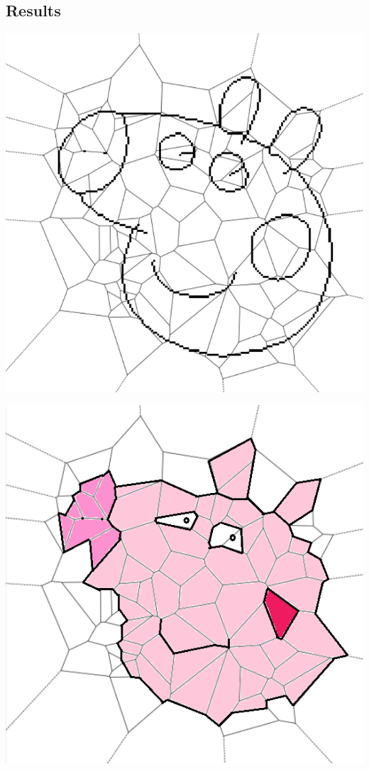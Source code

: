 \documentclass[a1,portrait]{a0poster}
\begin{document}
\begin{multicols}{2}

\section*{Results}

\begin{center}
	\centering
	\begin{minipage}{.5\linewidth}
		\centering
		\includegraphics[width=.95\linewidth]{proc/peppa1_skeleton.png}
		\label{fig:skeleton1}
	\end{minipage}%
	\begin{minipage}{.5\linewidth}
		\centering
		\includegraphics[width=.95\linewidth]{proc/peppa1_colored.png}

\end{minipage}
\end{center}
\end{multicols}
\end{document}
